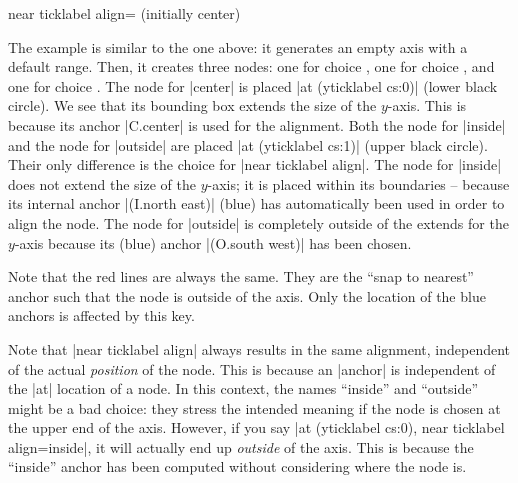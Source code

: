 \begin{pgfplotskey}{near ticklabel align= (initially center)}
\begin{codeexample}[width=4cm]
\end{codeexample}
    The example is similar to the one above: it generates an empty axis with a
    default range. Then, it creates three nodes: one for choice
    , one for choice , and one for
    choice . The node for |center| is placed
    |at (yticklabel cs:0)| (lower black circle). We see that its bounding box
    extends the size of the $y$-axis. This is because its anchor |C.center| is
    used for the alignment. Both the node for |inside| and the node for
    |outside| are placed |at (yticklabel cs:1)| (upper black circle). Their
    only difference is the choice for |near ticklabel align|. The node for
    |inside| does not extend the size of the $y$-axis; it is placed within its
    boundaries -- because its internal anchor |(I.north east)| (blue) has
    automatically been used in order to align the node. The node for |outside|
    is completely outside of the extends for the $y$-axis because its (blue)
    anchor |(O.south west)| has been chosen.

    Note that the red lines are always the same. They are the ``snap to
    nearest'' anchor such that the node is outside of the axis. Only the
    location of the blue anchors is affected by this key.

    Note that |near ticklabel align| always results in the same alignment,
    independent of the actual \emph{position} of the node. This is because an
    |anchor| is independent of the |at| location of a node. In this context,
    the names ``inside'' and ``outside'' might be a bad choice: they stress the
    intended meaning if the node is chosen at the upper end of the axis.
    However, if you say |at (yticklabel cs:0), near ticklabel align=inside|, it
    will actually end up \emph{outside} of the axis. This is because the
    ``inside'' anchor has been computed without considering where the node is.
\end{pgfplotskey}

